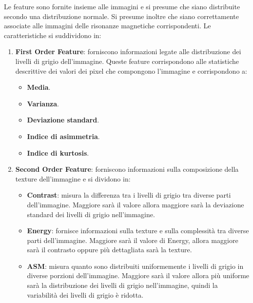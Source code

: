 Le feature sono fornite insieme alle immagini e si presume che siano distribuite
secondo una distribuzione normale. Si presume inoltre che siano correttamente
associate alle immagini delle risonanze magnetiche corrispondenti.
Le caratteristiche si suddividono in:
\begin{enumerate}
      \item \textbf{First Order Feature}: forniscono informazioni legate alle
            distribuzione dei livelli di grigio dell'immagine. Queste feature
            corrispondono alle statistiche descrittive dei valori dei pixel
            che compongono l'immagine e corrispondono a:
            \begin{itemize}
                  \item \textbf{Media}.
                  \item \textbf{Varianza}.
                  \item \textbf{Deviazione standard}.
                  \item \textbf{Indice di asimmetria}.
                  \item \textbf{Indice di kurtosis}.
            \end{itemize}
      \item \textbf{Second Order Feature}: forniscono informazioni sulla
            composizione della texture dell'immagine e si dividono in:
            \begin{itemize}
                  \item \textbf{Contrast}: misura la differenza tra i livelli di
                        grigio tra diverse parti dell'immagine. Maggiore sarà il
                        valore allora maggiore sarà la deviazione standard dei
                        livelli di grigio nell'immagine.
                  \item \textbf{Energy}: fornisce informazioni sulla texture e
                        sulla complessità tra diverse parti dell'immagine. Maggiore sarà il valore di Energy,
                        allora maggiore sarà il contrasto oppure più dettagliata
                        sarà la texture.
                  \item \textbf{ASM}: misura quanto sono distribuiti uniformemente
                        i livelli di grigio in diverse porzioni dell'immagine. Maggiore sarà il valore
                        allora più uniforme sarà la distribuzione dei livelli di
                        grigio nell'immagine, quindi la variabilità dei livelli
                        di grigio è ridotta.

\end{itemize}
\end{enumerate}
